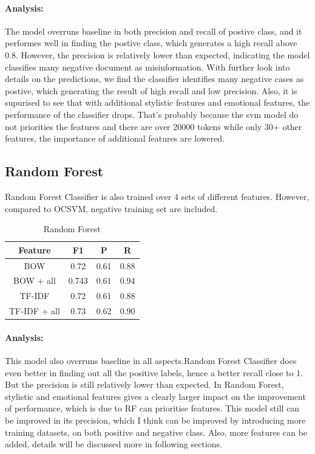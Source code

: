 \documentclass[11pt,a4paper]{article}
\begin{document}
\paragraph{Analysis:}
The model overruns baseline in both precision and recall of postive class, and it performes well in finding the postive class, which generates a high recall above 0.8. However, the precision is relatively lower than expected, indicating the model classifies many negative document as misinformation.
With further look into details on the predictions, we find the classifier identifies many negative cases as postive, which generating the result of high recall and low precision.
Also, it is supurised to see that with additional stylistic features and emotional features, the performance of the classifier drops. That's probably because the svm model do not priorities the features and there are over 20000 tokens while only 30+ other features, the importance of additional features are lowered.

\subsection{Random Forest}
Random Forest Classifier is also trained over 4 sets of different features. However, compared to OCSVM, negative training set are included.
\begin{table}[h!]
  \begin{center}
    \caption{Random Forest}
    \label{tab:table1}
    \begin{tabular}{c c c c}
      \textbf{Feature} & \textbf{F1} & \textbf{P} & \textbf{R}\\
      \hline
      BOW & 0.72 & 0.61 & 0.88\\
      BOW + all & 0.743 & 0.61 & 0.94\\
      TF-IDF & 0.72 & 0.61 & 0.88\\
      TF-IDF + all & 0.73 & 0.62 & 0.90\\
    \end{tabular}
  \end{center}
\end{table}

\paragraph{Analysis:}
This model also overruns baseline in all aspects.Random Forest Classifier does even better in finding out all the positive labels, hence a better recall close to 1. But the precision is still relatively lower than expected.
In Random Forest, stylistic and emotional features gives a clearly larger impact on the improvement of performance, which is due to RF can prioritise features.
This model still can be improved in its precision, which I think can be improved by introducing more training datasets, on both positive and negative class. Also, more features can be added, details will be discussed more in following sections.
\end{document}
